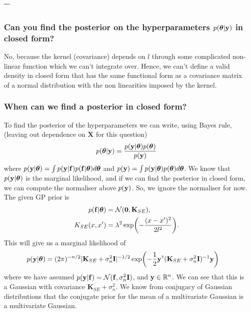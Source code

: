 \documentclass[a4paper]{article}
\newcommand{\questionref}[1]{\Cref{#1} -- \nameref{#1}}
\theoremstyle{definition}
\begin{document}
\subsection{\questionref{q:gp-hyper-conj}}

\subsubsection{Can you find the posterior on the hyperparameters $p(\boldsymbol{\theta}|\mathbf{y})$ in closed form?}
No, because the kernel (covariance) depends on $l$ through some complicated non-linear function which we can't integrate over.
Hence, we can't define a valid density in closed form that has the same functional form as a covariance matrix of a normal distribution with the non linearities imposed by the kernel.

\subsubsection{When can we find a posterior in closed form?}
To find the posterior of the hyperparameters we can write, using Bayes rule, (leaving out dependence on $\mathbf{X}$ for this question)
\begin{align}
p(\boldsymbol{\theta} | \mathbf{y}) = \frac{p(\mathbf{y} | \boldsymbol{\theta}) p(\boldsymbol{\theta})}{p(\mathbf{y})} 
\end{align}
where $p(\mathbf{y} | \boldsymbol{\theta}) = \int p(\mathbf{y} | \mathbf{f}) p(\mathbf{f}| \boldsymbol{\theta}) d \boldsymbol{\theta}$ and $p(\mathbf{y}) = \int p(\mathbf{y}| \boldsymbol{\theta}) p(\boldsymbol{\theta}) d\boldsymbol{\theta}$.
We know that $p(\mathbf{y} | \boldsymbol{\theta})$ is the marginal likelihood, and if we can find the posterior in closed form, we can compute the normaliser above $p(\mathbf{y})$.
So, we ignore the normaliser for now.
The given GP prior is
\begin{align}
p(\vf | \vtheta) &= \mathcal{N}(\mathbf{0}, \mathbf{K}_{SE}), \\
K_{SE}(x, x') &= \lambda^2 \exp \left(  - \frac{(x - x')^2}{2l^2} \right).
\end{align}
This will give us a marginal likelihood of
\begin{align}
p(\vy| \vtheta) & = (2 \pi)^{-n/2}|\mathbf{K}_{SE} + \sigma_n^2\mathbf{I}|^{-1/2} \exp \left( -\frac{1}{2} \vy \transpose (\mathbf{K}_{SE} + \sigma_n^2\mathbf{I})^{-1}  \vy \right)
\end{align}
where we have assumed $p(\mathbf{y} | \mathbf{f}) = \mathcal{N}(\mathbf{f}, \sigma^2_n \mathbf{I})$, and $\mathbf{y} \in \mathbb{R}^{n}$.
We can see that this is a Gaussian with covariance $\mathbf{K}_{SE} + \sigma_n^2$.
We know from conjugacy of Gaussian distributions that the conjugate prior for the mean of a multivariate Gaussian is a multivariate Gaussian.
\end{document}
